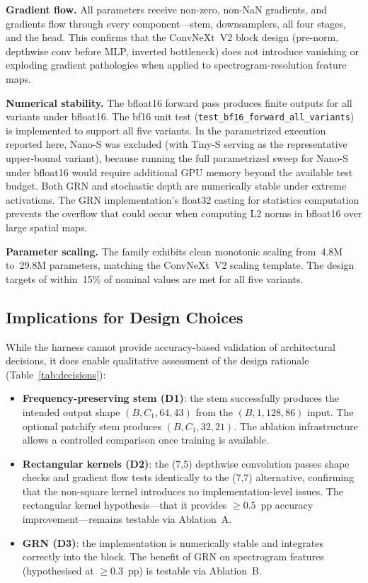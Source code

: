 \documentclass{article}
\begin{document}
\textbf{Gradient flow.} All parameters receive non-zero, non-NaN gradients, and
gradients flow through every component---stem, downsamplers, all four stages, and
the head. This confirms that the ConvNeXt~V2 block design (pre-norm, depthwise
conv before MLP, inverted bottleneck) does not introduce vanishing or exploding
gradient pathologies when applied to spectrogram-resolution feature maps.

\textbf{Numerical stability.} The bfloat16 forward pass produces finite outputs
for all variants under bfloat16. The bf16 unit test
(\texttt{test\_bf16\_forward\_all\_variants}) is implemented to support all
five variants. In the parametrized execution reported here, Nano-S was excluded
(with Tiny-S serving as the representative upper-bound variant), because
running the full parametrized sweep for Nano-S under bfloat16 would require
additional GPU memory beyond the available test budget. Both GRN and stochastic
depth are numerically stable under extreme activations. The GRN implementation's
float32 casting for statistics computation prevents the overflow that could
occur when computing L2 norms in bfloat16 over large spatial maps.

\textbf{Parameter scaling.} The family exhibits clean monotonic scaling from~4.8M
to~29.8M parameters, matching the ConvNeXt~V2 scaling template. The design
targets of within~15\% of nominal values are met for all five variants.

\subsection{Implications for Design Choices}

While the harness cannot provide accuracy-based validation of architectural
decisions, it does enable qualitative assessment of the design rationale
(Table~\ref{tab:decisions}):

\begin{itemize}
  \item \textbf{Frequency-preserving stem (D1)}: the stem successfully produces
  the intended output shape $(B, C_1, 64, 43)$ from the $(B, 1, 128, 86)$ input.
  The optional patchify stem produces $(B, C_1, 32, 21)$. The ablation
  infrastructure allows a controlled comparison once training is available.
  \item \textbf{Rectangular kernels (D2)}: the (7,5) depthwise convolution
  passes shape checks and gradient flow tests identically to the (7,7)
  alternative, confirming that the non-square kernel introduces no
  implementation-level issues. The rectangular kernel hypothesis---that it
  provides $\geq 0.5$~pp accuracy improvement---remains testable via Ablation~A.
  \item \textbf{GRN (D3)}: the implementation is numerically stable and
  integrates correctly into the block. The benefit of GRN on spectrogram
  features (hypothesised at $\geq 0.3$~pp) is testable via Ablation~B.
\end{itemize}
\end{document}
